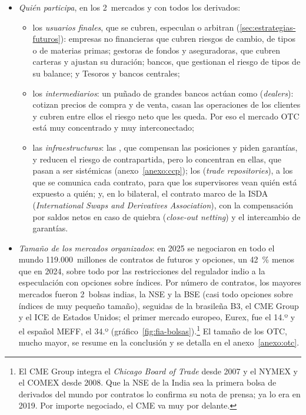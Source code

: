 \documentclass[11pt]{article}
\begin{document}
\begin{itemize}
\item \emph{Quién participa}, en los 2~mercados y con todos los derivados:
  \begin{itemize}
  \item los \emph{usuarios finales}, que se cubren, especulan o arbitran (\ref{sec:estrategias-futuros}): empresas no financieras que cubren riesgos de cambio, de tipos o de materias primas; gestoras de fondos y aseguradoras, que cubren carteras y ajustan su duración; bancos, que gestionan el riesgo de tipos de su balance; y Tesoros y bancos centrales;
  \item los \emph{intermediarios}: un puñado de grandes bancos actúan como  (\emph{dealers}): cotizan precios de compra y de venta, casan las operaciones de los clientes y cubren entre ellos el riesgo neto que les queda. Por eso el mercado OTC está muy concentrado y muy interconectado;
  \item las \emph{infraestructuras}: las , que compensan las posiciones y piden garantías, y reducen el riesgo de contrapartida, pero lo concentran en ellas, que pasan a ser sistémicas\nocite{NunezValdeolivas2019CCP,DuffieZhu2011Does} (anexo~\ref{anexo:ccp}); los  (\emph{trade repositories}), a los que se comunica cada contrato, para que los supervisores vean quién está expuesto a quién; y, en lo bilateral, el contrato marco de la ISDA (\emph{International Swaps and Derivatives Association}), con la compensación por saldos netos en caso de quiebra (\emph{close-out netting}) y el intercambio de garantías.
  \end{itemize}
\item \emph{Tamaño de los mercados organizados}: en 2025 se negociaron en todo el mundo 119.000~millones de contratos de futuros y opciones, un 42~\% menos que en 2024, sobre todo por las restricciones del regulador indio a la especulación con opciones sobre índices\nocite{FIA2026ETDDic}. Por número de contratos, los mayores mercados fueron 2~bolsas indias, la NSE y la BSE (casi todo opciones sobre índices de muy pequeño tamaño), seguidas de la brasileña B3, el CME Group y el ICE de Estados Unidos; el primer mercado europeo, Eurex, fue el 14.º y el español MEFF, el 34.º (gráfico~\ref{fig:fia-bolsas})\nocite{FIA2026ETDQ4}.\footnote{El CME Group integra el \emph{Chicago Board of Trade} desde 2007 y el NYMEX y el COMEX desde 2008\nocite{CME2020Form10K}. Que la NSE de la India sea la primera bolsa de derivados del mundo por contratos lo confirma su nota de prensa\nocite{NSE2026NotaPrensa}; ya lo era en 2019\nocite{Bloomberg2020India}. Por importe negociado, el CME va muy por delante.} El tamaño de los OTC, mucho mayor, se resume en la conclusión y se detalla en el anexo~\ref{anexo:otc}.

\end{itemize}
\end{document}
